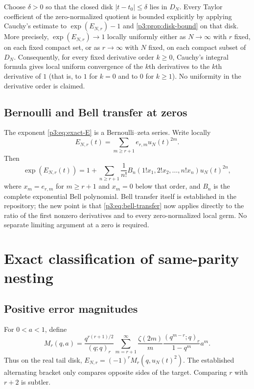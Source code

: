 \documentclass[11pt]{article}
\numberwithin{equation}{section}
\theoremstyle{definition}
\theoremstyle{remark}
\begin{document}
\begin{corollary}\label{p3:cor:cauchy-jets}
Choose $\delta>0$ so that the closed disk $|t-t_0|\le\delta$ lies in $D_N$.  Every Taylor
coefficient of the zero-normalized quotient is bounded explicitly by applying Cauchy's
estimate to $\exp(E_{N,r})-1$ and \cref{p3:prop:disk-bound} on that disk.  More precisely,
$\exp(E_{N,r})\to1$ locally uniformly either as $N\to\infty$ with $r$ fixed, on each fixed
compact set, or as $r\to\infty$ with $N$ fixed, on each compact subset of $D_N$.
Consequently, for every fixed derivative order $k\ge0$, Cauchy's integral formula gives
local uniform convergence of the $k$th derivatives to the $k$th derivative of $1$ (that is,
to $1$ for $k=0$ and to $0$ for $k\ge1$).  No uniformity in the derivative order is claimed.
\end{corollary}

\subsection{Bernoulli and Bell transfer at zeros}

The exponent \eqref{p3:eq:exact-E} is a Bernoulli--zeta series.  Write locally
\[
 E_{N,r}(t)=\sum_{m\ge r+1}e_{r,m}u_N(t)^{2m}.
\]
Then
\begin{equation}
 \exp(E_{N,r}(t))
 =1+\sum_{n\ge r+1}\frac{1}{n!}
 B_n(1!x_1,2!x_2,\ldots,n!x_n)u_N(t)^{2n},
 \label{p3:eq:bell-transfer}
\end{equation}
where $x_m=e_{r,m}$ for $m\ge r+1$ and $x_m=0$ below that order, and $B_n$ is the complete
exponential Bell polynomial.  Bell transfer itself is established in the repository; the new
point is that \eqref{p3:eq:bell-transfer} now applies directly to the ratio of the first nonzero
derivatives and to every zero-normalized local germ.  No separate limiting argument at a zero
is required.

\section{Exact classification of same-parity nesting}\label{p3:sec:nesting}

\subsection{Positive error magnitudes}

For $0<a<1$, define
\begin{equation}
 M_r(q,a)=\frac{q^{r(r+1)/2}}{(q;q)_r}
 \sum_{m=r+1}^{\infty}\frac{\zeta(2m)}{m}
 \frac{(q^{m-r};q)_r}{1-q^m}a^m.
 \label{p3:eq:Mr}
\end{equation}
Thus on the real tail disk, $E_{N,r}=(-1)^rM_r(q,u_N(t)^2)$.  The established alternating
bracket only compares opposite sides of the target.  Comparing $r$ with $r+2$ is subtler.
\end{document}
